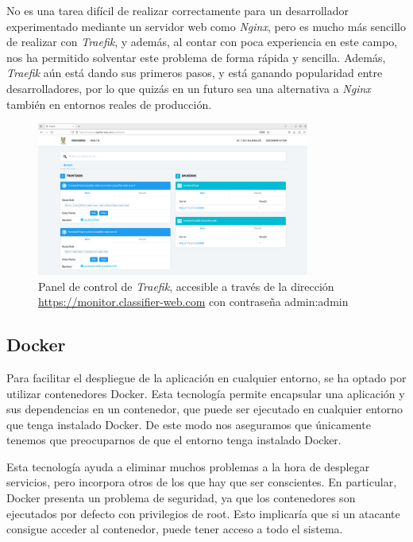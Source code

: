 No es una tarea difícil de realizar correctamente para un desarrollador experimentado mediante un servidor web como \textit{Nginx}, pero es mucho más sencillo de realizar con \textit{Traefik}, y además, al contar con poca experiencia en este campo, nos ha permitido solventar este problema de forma rápida y sencilla.
Además, \textit{Traefik} aún está dando sus primeros pasos, y está ganando popularidad entre desarrolladores, por lo que quizás en un futuro sea una alternativa a \textit{Nginx} también en entornos reales de producción.

\begin{figure}[htpb]
    \centering
    \includegraphics[width=0.8\textwidth]{cap3/images/monitor-dashboard.png}
    \caption{Panel de control de \textit{Traefik}, accesible a través de la dirección \url{https://monitor.classifier-web.com} con contraseña admin:admin}
    \label{fig:monitor-dashboard}
    
\end{figure}



\subsection{Docker}
Para facilitar el despliegue de la aplicación en cualquier entorno, se ha optado por utilizar contenedores Docker.
Esta tecnología permite encapsular una aplicación y sus dependencias en un contenedor, que puede ser ejecutado en cualquier entorno que tenga instalado Docker.
De este modo nos aseguramos que únicamente tenemos que preocuparnos de que el entorno tenga instalado Docker.

Esta tecnología ayuda a eliminar muchos problemas a la hora de desplegar servicios, pero incorpora otros de los que hay que ser conscientes.
En particular, Docker presenta un problema de seguridad, ya que los contenedores son ejecutados por defecto con privilegios de root.
Esto implicaría que si un atacante consigue acceder al contenedor, puede tener acceso a todo el sistema.

